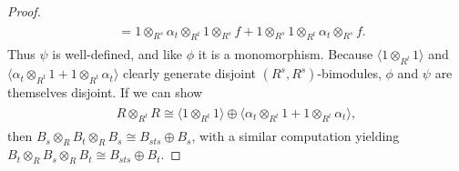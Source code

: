 \begin{proof}
\begin{align*}
\begin{split}
&= 1 \otimes_{R^s} \alpha_t \otimes_{R^t} 1 \otimes_{R^s} f + 1 \otimes_{R^s} 1 \otimes_{R^t} \alpha_t \otimes_{R^s} f.
\end{split}
\end{align*}
\noindent Thus $\psi$ is well-defined, and like $\phi$ it is a monomorphism. Because $\langle 1 \otimes_{R^t} 1\rangle$ and $\langle \alpha_t \otimes_{R^t} 1 + 1 \otimes_{R^t} \alpha_t\rangle$ clearly generate disjoint $(R^s, R^s)$-bimodules, $\phi$ and $\psi$ are themselves disjoint. If we can show
\begin{align*}
\begin{split}
R \otimes_{R^t} R \cong \langle 1 \otimes_{R^t} 1\rangle \oplus \langle \alpha_t \otimes_{R^t} 1 + 1 \otimes_{R^t} \alpha_t\rangle,
\end{split}
\end{align*} %
\noindent then $B_s \otimes_R B_t \otimes_R B_s \cong B_{sts} \oplus B_s$, with a similar computation yielding $B_t \otimes_R B_s \otimes_R B_t \cong B_{sts} \oplus B_t$.\newpage


\end{proof}
